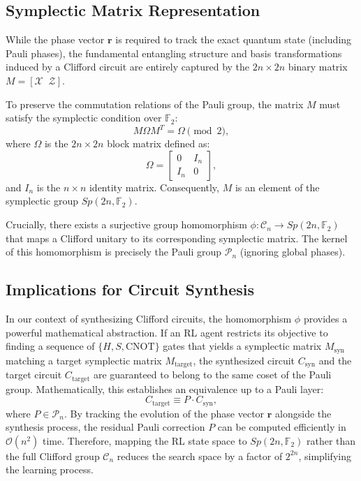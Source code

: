 \documentclass[conference]{IEEEtran}
\begin{document}
\subsection{Symplectic Matrix Representation}
While the phase vector $\mathbf{r}$ is required to track the exact quantum state (including Pauli phases), the fundamental entangling structure and basis transformations induced by a Clifford circuit are entirely captured by the $2n \times 2n$ binary matrix $M = [\mathcal{X} \;\; \mathcal{Z}]$.

To preserve the commutation relations of the Pauli group, the matrix $M$ must satisfy the symplectic condition over $\mathbb{F}_2$:
\begin{equation}
    M \Omega M^T = \Omega \pmod 2,
\end{equation}
where $\Omega$ is the $2n \times 2n$ block matrix defined as:
\begin{equation}
    \Omega = \begin{bmatrix}
    0 & I_n \\
    I_n & 0
    \end{bmatrix},
\end{equation}
and $I_n$ is the $n \times n$ identity matrix. Consequently, $M$ is an element of the symplectic group $Sp(2n, \mathbb{F}_2)$. 



Crucially, there exists a surjective group homomorphism $\phi : \mathcal{C}_n \rightarrow Sp(2n, \mathbb{F}_2)$ that maps a Clifford unitary to its corresponding symplectic matrix. The kernel of this homomorphism is precisely the Pauli group $\mathcal{P}_n$ (ignoring global phases). 

\subsection{Implications for Circuit Synthesis}

In our context of synthesizing Clifford circuits, the homomorphism $\phi$ provides a powerful mathematical abstraction. If an RL agent restricts its objective to finding a sequence of $\{H, S, \text{CNOT}\}$ gates that yields a symplectic matrix $M_{\text{syn}}$ matching a target symplectic matrix $M_{\text{target}}$, the synthesized circuit $C_{\text{syn}}$ and the target circuit $C_{\text{target}}$ are guaranteed to belong to the same coset of the Pauli group.
Mathematically, this establishes an equivalence up to a Pauli layer:
\begin{equation}
    C_{\text{target}} \equiv P \cdot C_{\text{syn}},
\end{equation}
where $P \in \mathcal{P}_n$. 
By tracking the evolution of the phase vector $\mathbf{r}$ alongside the synthesis process, the residual Pauli correction $P$ can be computed efficiently in $\mathcal{O}(n^2)$ time. Therefore, mapping the RL state space to $Sp(2n, \mathbb{F}_2)$ rather than the full Clifford group $\mathcal{C}_n$ reduces the search space by a factor of $2^{2n}$, simplifying the learning process.
\end{document}
